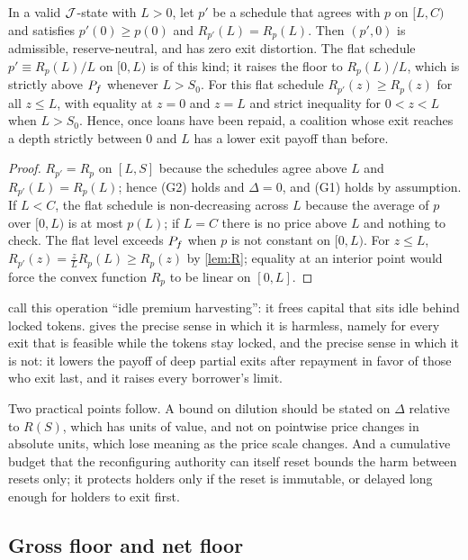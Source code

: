 \begin{proposition}\label{prop:harvest}
In a valid $\mathcal{J}$-state with $L>0$, let $p'$ be a schedule that agrees with $p$ on $[L,C)$ and satisfies $p'(0)\ge p(0)$ and $R_{p'}(L)=R_p(L)$. Then $(p',0)$ is admissible, reserve-neutral, and has zero exit distortion. The flat schedule $p'\equiv R_p(L)/L$ on $[0,L)$ is of this kind; it raises the floor to $R_p(L)/L$, which is strictly above $P_f$ whenever $L>S_0$. For this flat schedule $R_{p'}(z)\ge R_p(z)$ for all $z\le L$, with equality at $z=0$ and $z=L$ and strict inequality for $0<z<L$ when $L>S_0$. Hence, once loans have been repaid, a coalition whose exit reaches a depth strictly between $0$ and $L$ has a lower exit payoff than before.
\end{proposition}
\begin{proof}
$R_{p'}=R_p$ on $[L,S]$ because the schedules agree above $L$ and $R_{p'}(L)=R_p(L)$; hence (G2) holds and $\Delta=0$, and (G1) holds by assumption. If $L<C$, the flat schedule is non-decreasing across $L$ because the average of $p$ over $[0,L)$ is at most $p(L)$; if $L=C$ there is no price above $L$ and nothing to check. The flat level exceeds $P_f$ when $p$ is not constant on $[0,L)$. For $z\le L$, $R_{p'}(z)=\tfrac zL R_p(L)\ge R_p(z)$ by \cref{lem:R}; equality at an interior point would force the convex function $R_p$ to be linear on $[0,L]$.
\end{proof}

 call this operation ``idle premium harvesting'': it frees capital that sits idle behind locked tokens.  gives the precise sense in which it is harmless, namely for every exit that is feasible while the tokens stay locked, and the precise sense in which it is not: it lowers the payoff of deep partial exits after repayment in favor of those who exit last, and it raises every borrower's limit.

Two practical points follow. A bound on dilution should be stated on $\Delta$ relative to $R(S)$, which has units of value, and not on pointwise price changes in absolute units, which lose meaning as the price scale changes. And a cumulative budget that the reconfiguring authority can itself reset bounds the harm between resets only; it protects holders only if the reset is immutable, or delayed long enough for holders to exit first.

\subsection{Gross floor and net floor}\label{sec:net}

